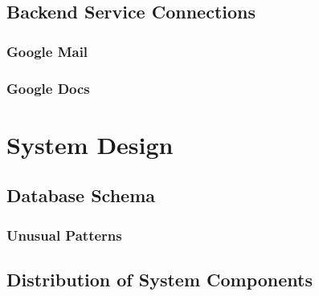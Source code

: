 \subsection{Backend Service Connections}

\subsubsection{Google Mail}

\subsubsection{Google Docs}


\section{System Design}

\subsection{Database Schema}

\subsubsection{Unusual Patterns}

\subsection{Distribution of System Components}
